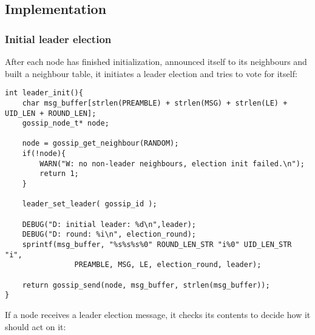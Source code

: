 \documentclass[11pt,
  a4paper,
  ngerman,
  BCOR=7mm
]{scrartcl}
\begin{document}
\subsection*{Implementation}
\label{sub:implementation_leader_election}

\subsubsection*{Initial leader election}
\label{ssub:initial_leader_election}
After each node has finished initialization, announced itself to its
neighbours and built a neighbour table, it initiates a leader election
and tries to vote for itself:

\begin{lstlisting}
int leader_init(){
    char msg_buffer[strlen(PREAMBLE) + strlen(MSG) + strlen(LE) + UID_LEN + ROUND_LEN];
    gossip_node_t* node;

    node = gossip_get_neighbour(RANDOM);
    if(!node){
        WARN("W: no non-leader neighbours, election init failed.\n");
        return 1;
    }

    leader_set_leader( gossip_id );

    DEBUG("D: initial leader: %d\n",leader);
    DEBUG("D: round: %i\n", election_round);
    sprintf(msg_buffer, "%s%s%s%0" ROUND_LEN_STR "i%0" UID_LEN_STR "i",
                PREAMBLE, MSG, LE, election_round, leader);

    return gossip_send(node, msg_buffer, strlen(msg_buffer));
}
\end{lstlisting}

\newpage

If a node receives a leader election message, it checks its contents to
decide how it should act on it:
\end{document}
